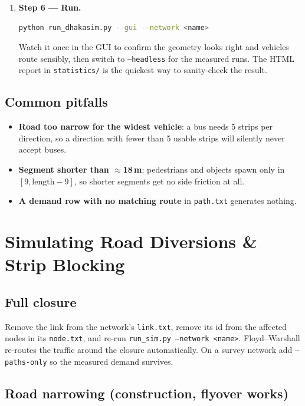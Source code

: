 \documentclass[11pt, a4paper]{article}
\newcommand{\code}[1]{\texttt{#1}}
\begin{document}
\begin{enumerate}
    \item \textbf{Step 6 --- Run.}
\begin{lstlisting}[language=bash]
python run_dhakasim.py --gui --network <name>
\end{lstlisting}
    Watch it once in the GUI to confirm the geometry looks right and vehicles
    route sensibly, then switch to \code{--headless} for the measured runs. The
    HTML report in \code{statistics/} is the quickest way to sanity-check the
    result.
\end{enumerate}

\subsection*{Common pitfalls}
\begin{itemize}
    \item \textbf{Road too narrow for the widest vehicle}: a bus needs 5 strips
          per direction, so a direction with fewer than 5 usable strips will
          silently never accept buses.
    \item \textbf{Segment shorter than $\approx$18\,m}: pedestrians and objects
          spawn only in $[9, \text{length}-9]$, so shorter segments get no side
          friction at all.
    \item \textbf{A demand row with no matching route} in \code{path.txt}
          generates nothing.
\end{itemize}

\section{Simulating Road Diversions \& Strip Blocking}

\subsection{Full closure}

Remove the link from the network's \code{link.txt}, remove its id from the
affected nodes in its \code{node.txt}, and re-run
\code{run\_sim.py --network <name>}. Floyd--Warshall re-routes the traffic around
the closure automatically. On a survey network add \code{--paths-only} so the
measured demand survives.

\subsection{Road narrowing (construction, flyover works)}
\end{document}
